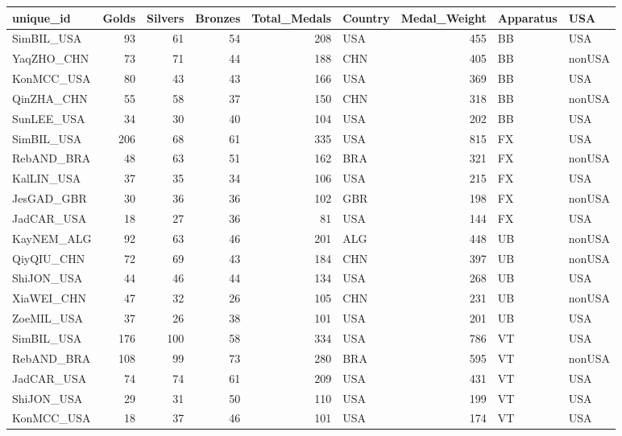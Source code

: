 \documentclass[
  letterpaper,
  DIV=11,
  numbers=noendperiod]{scrartcl}
\begin{document}
\begin{tabular}{l|r|r|r|r|l|r|l|l}
\hline
unique\_id & Golds & Silvers & Bronzes & Total\_Medals & Country & Medal\_Weight & Apparatus & USA\\
\hline
SimBIL\_USA & 93 & 61 & 54 & 208 & USA & 455 & BB & USA\\
\hline
YaqZHO\_CHN & 73 & 71 & 44 & 188 & CHN & 405 & BB & nonUSA\\
\hline
KonMCC\_USA & 80 & 43 & 43 & 166 & USA & 369 & BB & USA\\
\hline
QinZHA\_CHN & 55 & 58 & 37 & 150 & CHN & 318 & BB & nonUSA\\
\hline
SunLEE\_USA & 34 & 30 & 40 & 104 & USA & 202 & BB & USA\\
\hline
SimBIL\_USA & 206 & 68 & 61 & 335 & USA & 815 & FX & USA\\
\hline
RebAND\_BRA & 48 & 63 & 51 & 162 & BRA & 321 & FX & nonUSA\\
\hline
KalLIN\_USA & 37 & 35 & 34 & 106 & USA & 215 & FX & USA\\
\hline
JesGAD\_GBR & 30 & 36 & 36 & 102 & GBR & 198 & FX & nonUSA\\
\hline
JadCAR\_USA & 18 & 27 & 36 & 81 & USA & 144 & FX & USA\\
\hline
KayNEM\_ALG & 92 & 63 & 46 & 201 & ALG & 448 & UB & nonUSA\\
\hline
QiyQIU\_CHN & 72 & 69 & 43 & 184 & CHN & 397 & UB & nonUSA\\
\hline
ShiJON\_USA & 44 & 46 & 44 & 134 & USA & 268 & UB & USA\\
\hline
XiaWEI\_CHN & 47 & 32 & 26 & 105 & CHN & 231 & UB & nonUSA\\
\hline
ZoeMIL\_USA & 37 & 26 & 38 & 101 & USA & 201 & UB & USA\\
\hline
SimBIL\_USA & 176 & 100 & 58 & 334 & USA & 786 & VT & USA\\
\hline
RebAND\_BRA & 108 & 99 & 73 & 280 & BRA & 595 & VT & nonUSA\\
\hline
JadCAR\_USA & 74 & 74 & 61 & 209 & USA & 431 & VT & USA\\
\hline
ShiJON\_USA & 29 & 31 & 50 & 110 & USA & 199 & VT & USA\\
\hline
KonMCC\_USA & 18 & 37 & 46 & 101 & USA & 174 & VT & USA\\
\hline
\end{tabular}
\end{document}
